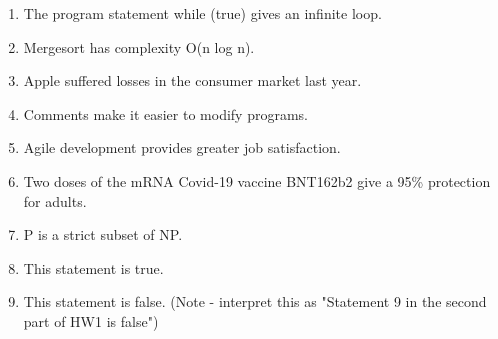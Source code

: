 \documentclass[english]{report}
\begin{document}
\begin{enumerate}
  
\item The program statement while (true) {} gives an infinite loop.
  
\item Mergesort has complexity O(n log n).
  
\item Apple suffered losses in the consumer market last year.

\item Comments make it easier to modify programs.

\item Agile development provides greater job satisfaction.
  
\item Two doses of the mRNA Covid-19 vaccine BNT162b2 give a 95\% protection for adults.
  
\item P is a strict subset of NP.
  
\item This statement is true.
  
\item This statement is false. (Note - interpret this as "Statement 9 in the second part of HW1 is false")
  
\end{enumerate}




\renewcommand{\bibname}{References}

\end{document}
